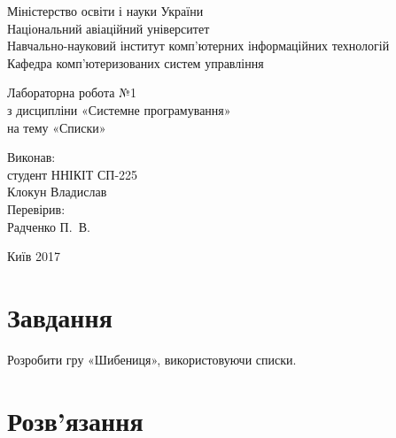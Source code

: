 \documentclass[a4paper,oneside,DIV=12,12pt]{scrartcl}
\begin{document}
	\begin{titlepage}
    \begin{center}
	Міністерство освіти і науки України\\
	Національний авіаційний університет\\
	Навчально-науковий інститут комп'ютерних інформаційних технологій\\
	Кафедра комп'ютеризованих систем управління

	\vspace{\fill}

	Лабораторна робота №1\\
	з дисципліни «Системне програмування»\\
	на тему «Списки»

	\vspace{\fill}
	
	\begin{flushright}
				Виконав:\\
				студент ННІКІТ СП-225\\
				Клокун Владислав\\
				Перевірив:\\
				Радченко П.~В.
	\end{flushright}

	Київ 2017

    \end{center}
    \end{titlepage}
	
	\section{Завдання}
		Розробити гру «Шибениця», використовуючи списки.
		
	\section{Розв'язання}
		
\end{document}
